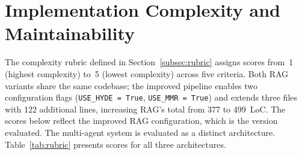 \section{Implementation Complexity and Maintainability}
\label{sec:complexity}

The complexity rubric defined in Section~\ref{subsec:rubric} assigns scores from~1 (highest complexity) to~5 (lowest complexity) across five criteria. Both RAG variants share the same codebase; the improved pipeline enables two configuration flags (\texttt{USE\_HYDE = True}, \texttt{USE\_MMR = True}) and extends three files with 122 additional lines, increasing RAG's total from 377 to 499~LoC. The scores below reflect the improved RAG configuration, which is the version evaluated. The multi-agent system is evaluated as a distinct architecture. Table~\ref{tab:rubric} presents scores for all three architectures.


